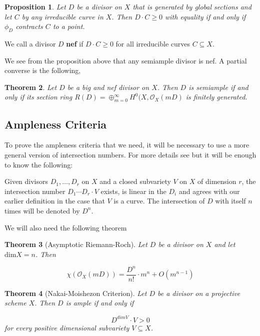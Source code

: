 \documentclass[a4paper]{article}
\newcommand{\Oc}{\mathcal{O}}
\newtheorem{theorem}{Theorem}
\newtheorem{proposition}[theorem]{Proposition}
\numberwithin{theorem}{section}
\begin{document}
\begin{proposition}\label{contract}
Let $D$ be a divisor on $X$ that is generated by global sections and let $C$ by any irreducible curve in $X$. Then $D \cdot C \geq 0$ with equality if and only if $\phi_D$ contracts $C$ to a point.
\end{proposition}

We call a divisor $D$ \textbf{nef} if $D \cdot C \geq 0$ for all irreducible curves $C \subseteq X$. 

We see from the proposition above that any semiample divisor is nef. A partial converse is the following,

\begin{theorem}\label{fingen}
Let $D$ be a big and nef divisor on $X$. Then $D$ is semiample if and only if its section ring $R(D) = \oplus_{m=0}^\infty H^0(X, \mathcal{O}_X(mD)$ is finitely generated.

\end{theorem}

\subsection{Ampleness Criteria}
To prove the ampleness criteria that we need, it will be necessary to use a more general version of intersection numbers. For more details see \cite{MR1644323} but it will be enough to know the following:

Given divisors $D_1,\dots,D_r$ on $X$ and a closed subvariety $V$ on $X$ of dimension $r$, the intersection number $D_1 \cdots D_r \cdot V$ exists, is linear in the $D_i$ and agrees with our earlier definition in the case that $V$ is a curve. The intersection of $D$ with itself $n$ times will be denoted by $D^n$.

We will also need the following theorem

\begin{theorem}[Asymptotic Riemann-Roch]\label{arr}
Let $D$ be a divisor on $X$ and let $\text{dim}X = n$. Then

$$ \chi( \Oc_X(mD)) = \frac{D^n}{n!} \cdot m^n + O(m^{n-1}) $$

\end{theorem}
\begin{theorem}[Nakai-Moishezon Criterion]\label{nakai}
Let $D$ be a divisor on a projective scheme $X$. Then $D$ is ample if and only if

$$ D^{dim V}\cdot V > 0 $$
for every positive dimensional subvariety $V \subseteq X$.

\end{theorem}
\end{document}
